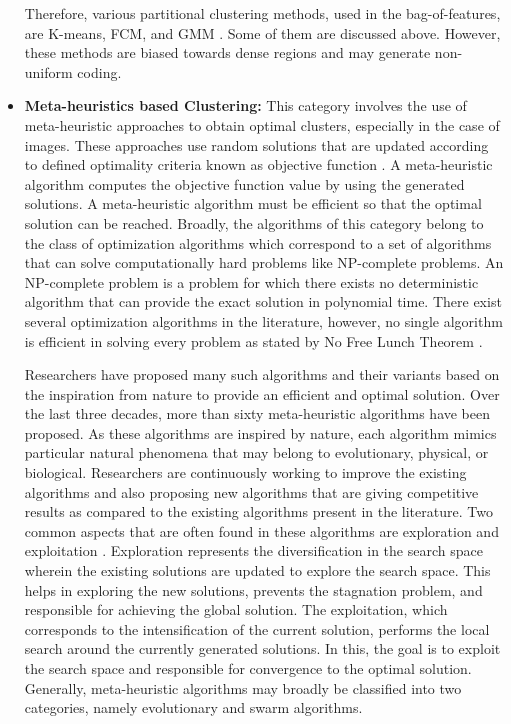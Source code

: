 \begin{itemize}
Therefore, various partitional clustering methods, used in the bag-of-features, are K-means, FCM, and GMM \cite{saygili2015}. Some of them are discussed above. However, these methods are biased towards dense regions and may generate non-uniform coding. 

\item \textbf {Meta-heuristics based Clustering:} This category involves the use of meta-heuristic approaches to obtain optimal clusters, especially in the case of images. These approaches use random solutions that are updated according to defined optimality criteria known as objective function \cite{zhang2011image}. A meta-heuristic algorithm computes the objective function value by using the generated solutions. A meta-heuristic algorithm must be efficient so that the optimal solution can be reached.  Broadly, the algorithms of this category belong to the class of optimization algorithms which correspond to a set of algorithms that can solve computationally hard problems like NP-complete problems. An NP-complete problem is a problem for which there exists no deterministic algorithm that can provide the exact solution in polynomial time. There exist several optimization algorithms in the literature, however, no single algorithm is efficient in solving every problem as stated by No Free Lunch Theorem \cite{wolpert1997}.

Researchers have proposed many such algorithms and their variants based on the inspiration from nature to provide an efficient and optimal solution. Over the last three decades, more than sixty meta-heuristic algorithms have been proposed. As these algorithms are inspired by nature, each algorithm mimics particular natural phenomena that may belong to evolutionary, physical, or biological. Researchers are continuously working to improve the existing algorithms and also proposing new algorithms that are giving competitive results as compared to the existing algorithms present in the literature.  Two common aspects that are often found in these algorithms are exploration and exploitation \cite{yang2014}. Exploration represents the diversification in the search space wherein the existing solutions are updated to explore the search space. This helps in exploring the new solutions, prevents the stagnation problem, and responsible for achieving the global solution. The exploitation, which corresponds to the intensification of the current solution, performs the local search around the currently generated solutions. In this, the goal is to exploit the search space and responsible for convergence to the optimal solution. Generally, meta-heuristic algorithms may broadly be classified into two categories, namely evolutionary and swarm algorithms.


\end{itemize}

